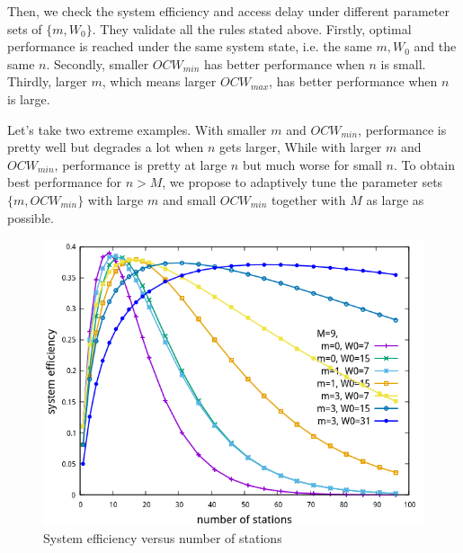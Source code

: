 Then, we check the system efficiency and access delay under different parameter sets of $\lbrace m, W_0 \rbrace$. They validate all the rules stated above. 
Firstly, optimal performance is reached under the same system state, i.e. the same $m,W_0$ and the same $n$.
Secondly, smaller $OCW_{min}$ has better performance when $n$ is small.
Thirdly, larger $m$, which means larger $OCW_{max}$, has better performance when $n$ is large. 

Let's take two extreme examples. With smaller $m$ and $OCW_{min}$, performance is pretty well but degrades a lot when $n$ gets larger,
While with larger $m$ and $OCW_{min}$, performance is pretty at large $n$ but much worse for small $n$.
To obtain best performance for $n>M$, we propose to adaptively tune the parameter sets $\lbrace m, OCW_{min}\rbrace$ with large $m$ and small $OCW_{min}$ together with $M$ as large as possible. 

\begin{figure}[!ht]
\includegraphics[scale=.54]{./figure/n_eff_perf.png}
\caption{System efficiency versus number of stations}
\label{fig_n_eff}
\end{figure}


